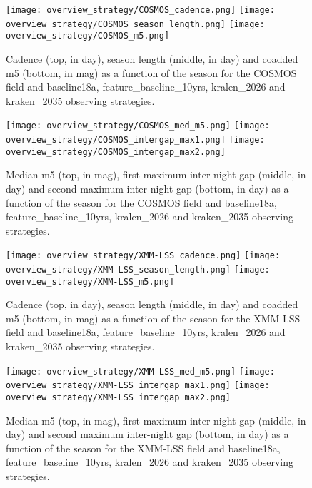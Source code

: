 \begin{figure}[!htbp]
\begin{center}
  \texttt{[image: overview\_strategy/COSMOS\_cadence.png]}
  \texttt{[image: overview\_strategy/COSMOS\_season\_length.png]}
  \texttt{[image: overview\_strategy/COSMOS\_m5.png]}
 \caption{Cadence (top, in day), season length (middle, in day) and coadded m5 (bottom, in mag) as a function of the season for the COSMOS field and baseline18a, feature\_baseline\_10yrs, kralen\_2026 and kraken\_2035 observing strategies.}\label{fig:cosmoscad}
\end{center}
\end{figure}

\begin{figure}[!htbp]
\begin{center}
  
  \texttt{[image: overview\_strategy/COSMOS\_med\_m5.png]}
  \texttt{[image: overview\_strategy/COSMOS\_intergap\_max1.png]}
    \texttt{[image: overview\_strategy/COSMOS\_intergap\_max2.png]}
 \caption{Median m5 (top, in mag), first maximum inter-night gap (middle, in day) and second maximum inter-night gap (bottom, in day)  as a function of the season for the COSMOS field and baseline18a, feature\_baseline\_10yrs, kralen\_2026 and kraken\_2035 observing strategies.}\label{fig:cosmos_m5}
\end{center}
\end{figure}



\begin{figure}[!htbp]
\begin{center}
  \texttt{[image: overview\_strategy/XMM-LSS\_cadence.png]}
  \texttt{[image: overview\_strategy/XMM-LSS\_season\_length.png]}
  \texttt{[image: overview\_strategy/XMM-LSS\_m5.png]}
 \caption{Cadence (top, in day), season length (middle, in day) and coadded m5 (bottom, in mag) as a function of the season for the XMM-LSS field and baseline18a, feature\_baseline\_10yrs, kralen\_2026 and kraken\_2035 observing strategies.}\label{fig:xmm-lss_cad}
\end{center}
\end{figure}

\begin{figure}[!htbp]
\begin{center}
  
  \texttt{[image: overview\_strategy/XMM-LSS\_med\_m5.png]}
  \texttt{[image: overview\_strategy/XMM-LSS\_intergap\_max1.png]}
    \texttt{[image: overview\_strategy/XMM-LSS\_intergap\_max2.png]}
 \caption{Median m5 (top, in mag), first maximum inter-night gap (middle, in day) and second maximum inter-night gap (bottom, in day)  as a function of the season for the XMM-LSS field and baseline18a, feature\_baseline\_10yrs, kralen\_2026 and kraken\_2035 observing strategies.}\label{fig:xmm-lss_m5}
\end{center}
\end{figure}


